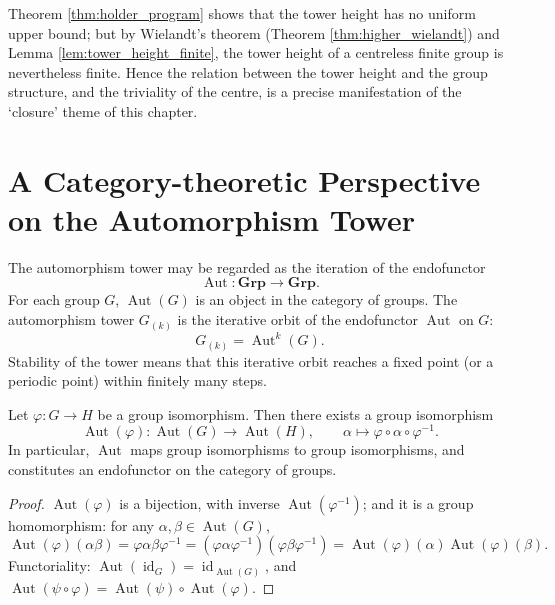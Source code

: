 \begin{remark}\label{rem:holder_program_boundary}
Theorem \ref{thm:holder_program} shows that the tower height has no uniform upper bound; but by Wielandt's theorem (Theorem \ref{thm:higher_wielandt}) and Lemma \ref{lem:tower_height_finite}, the tower height of a centreless finite group is nevertheless finite. Hence the relation between the tower height and the group structure, and the triviality of the centre, is a precise manifestation of the `closure' theme of this chapter.
\end{remark}

\section{A Category-theoretic Perspective on the Automorphism Tower}

\begin{remark}\label{rem:tower_categorical}
The automorphism tower may be regarded as the iteration of the endofunctor
\[
\operatorname{Aut}: \mathbf{Grp} \to \mathbf{Grp}.
\]
For each group $G$, $\operatorname{Aut}(G)$ is an object in the category of groups. The automorphism tower $G_{(k)}$ is the iterative orbit of the endofunctor $\operatorname{Aut}$ on $G$:
\[
G_{(k)} = \operatorname{Aut}^k(G).
\]
Stability of the tower means that this iterative orbit reaches a fixed point (or a periodic point) within finitely many steps.
\end{remark}

\begin{proposition}\label{prop:aut_functor}
Let $\varphi: G\to H$ be a group isomorphism. Then there exists a group isomorphism
\[
\operatorname{Aut}(\varphi): \operatorname{Aut}(G)\to\operatorname{Aut}(H),\qquad \alpha\mapsto \varphi\circ\alpha\circ\varphi^{-1}.
\]
In particular, $\operatorname{Aut}$ maps group isomorphisms to group isomorphisms, and constitutes an endofunctor on the category of groups.
\end{proposition}

\begin{proof}
$\operatorname{Aut}(\varphi)$ is a bijection, with inverse $\operatorname{Aut}(\varphi^{-1})$; and it is a group homomorphism: for any $\alpha,\beta\in\operatorname{Aut}(G)$,
\[
\operatorname{Aut}(\varphi)(\alpha\beta) = \varphi\alpha\beta\varphi^{-1} = (\varphi\alpha\varphi^{-1})(\varphi\beta\varphi^{-1}) = \operatorname{Aut}(\varphi)(\alpha)\operatorname{Aut}(\varphi)(\beta).
\]
Functoriality: $\operatorname{Aut}(\operatorname{id}_G)=\operatorname{id}_{\operatorname{Aut}(G)}$, and $\operatorname{Aut}(\psi\circ\varphi)=\operatorname{Aut}(\psi)\circ\operatorname{Aut}(\varphi)$.
\end{proof}

